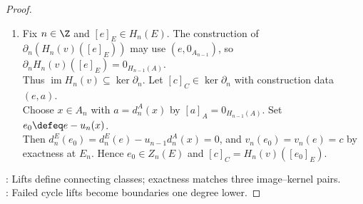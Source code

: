 \begin{theorem}
\begin{proof}
\begin{enumerate}[label=(\roman*)]
The map $v_{n+1}$ is surjective by Corollary \ref{cor:short-exact-complexes-degreewise-criterion} and Definition \ref{def:module-homomorphism}(iv). Choose $e'\in E_{n+1}$ with $v_{n+1}(e')=c$.\\
$v_n(e-d^E_{n+1}(e'))=v_n(e)-d^C_{n+1}(c)=0$ by chain-map identity for $v_\bullet$. Thus $e-d^E_{n+1}(e')\in\ker v_n=\operatorname{im}u_n$ by Corollary \ref{cor:short-exact-complexes-degreewise-criterion}.\\
Choose $a\in A_n$ with $u_n(a)=e-d^E_{n+1}(e')$. Then $u_{n-1}d^A_n(a)=d^E_nu_n(a)=0$ by $e\in Z_n(E)$, Definition \ref{def:chain-complex}.\\
Map $u_{n-1}$ is monomorphism by Corollary \ref{cor:short-exact-complexes-degreewise-criterion}; injective by Definition \ref{def:module-homomorphism}(iv), so $a\in Z_n(A)$; $[e]_E=[u_n(a)]_E=H_n(u)([a]_A)$.
\item Fix $n\in\Z$ and $[e]_E\in H_n(E)$. The construction of $\partial_n(H_n(v)([e]_E))$ may use $(e,0_{A_{n-1}})$, so $\partial_nH_n(v)([e]_E)=0_{H_{n-1}(A)}$.\\
Thus $\operatorname{im}H_n(v)\subseteq\ker\partial_n$. Let $[c]_C\in\ker\partial_n$ with construction data $(e,a)$.\\
Choose $x\in A_n$ with $a=d^A_n(x)$ by $[a]_A=0_{H_{n-1}(A)}$. Set $e_0\defeq e-u_n(x)$.\\
Then $d^E_n(e_0)=d^E_n(e)-u_{n-1}d^A_n(x)=0$, and $v_n(e_0)=v_n(e)=c$ by exactness at $E_n$. Hence $e_0\in Z_n(E)$ and $[c]_C=H_n(v)([e_0]_E)$.
\end{enumerate}
: Lifts define connecting classes; exactness matches three image--kernel pairs.\\
: Failed cycle lifts become boundaries one degree lower.
\end{proof}
\end{theorem}
